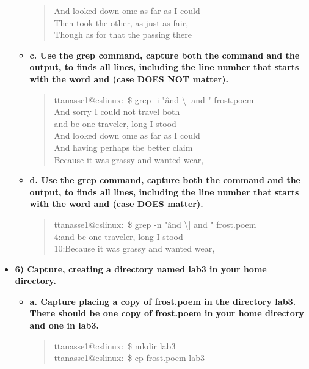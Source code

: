 \documentclass{article}
\begin{document}
\begin{itemize}
\begin{itemize}
\begin{quote}
And looked down ome as far as I could\\
Then took the other, as just as fair,\\
Though as for that the passing there
    \end{quote}
    \item \textbf{c. Use the grep command, capture both the command and the output, to finds all lines, including the line number that starts with the word and (case DOES NOT matter).}
    \begin{quote}
      ttanasse1@cslinux:~\$ grep -i "\^and \textbackslash| and " frost.poem\\
And sorry I could not travel both\\
and be one traveler, long I stood\\
And looked down ome as far as I could\\
And having perhaps the better claim\\
Because it was grassy and wanted wear,\\
    \end{quote}
    \item \textbf{d. Use the grep command, capture both the command and the output, to finds all lines, including the line number that starts with the word and (case DOES matter).}
    \begin{quote}
      ttanasse1@cslinux:~\$ grep -n "\^and \textbackslash| and " frost.poem\\
4:and be one traveler, long I stood\\
10:Because it was grassy and wanted wear,\\
    \end{quote}
  \end{itemize}
  \item \textbf{6) Capture, creating a directory named lab3 in your home directory. }
  \begin{itemize}
    \item \textbf{a. Capture placing a copy of frost.poem in the directory lab3.  There should be one copy of frost.poem in your home directory and one in lab3. }
    \begin{quote}
      ttanasse1@cslinux:~\$ mkdir lab3\\
ttanasse1@cslinux:~\$ cp frost.poem lab3


\end{quote}
\end{itemize}
\end{itemize}
\end{document}
